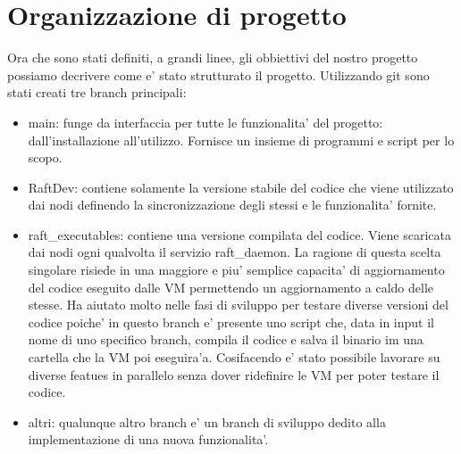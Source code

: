 \section{Organizzazione di progetto}
Ora che sono stati definiti, a grandi linee, gli obbiettivi del nostro progetto possiamo
decrivere come e' stato strutturato il progetto. 
Utilizzando git sono stati creati tre branch principali:
\begin{itemize}
    \item main: funge da interfaccia per tutte le funzionalita' del progetto:
                dall'installazione all'utilizzo. Fornisce un insieme di programmi e script
                per lo scopo.
    \item RaftDev:  contiene solamente la versione stabile del codice che viene utilizzato dai nodi
                    definendo la sincronizzazione degli stessi e le funzionalita' fornite.
    \item raft\_executables: contiene una versione compilata del codice. Viene scaricata dai nodi
                            ogni qualvolta il servizio raft\_daemon. La ragione di questa 
                            scelta singolare risiede in una maggiore e piu' semplice capacita' di
                            aggiornamento del codice eseguito dalle VM permettendo un aggiornamento
                            a caldo delle stesse. Ha aiutato molto nelle fasi di sviluppo per testare
                            diverse versioni del codice poiche' in questo branch e' presente uno script
                            che, data in input il nome di uno specifico branch, compila il codice
                            e salva il binario im una cartella che la VM poi eseguira'a.
                            Cosifacendo e' stato possibile lavorare su diverse featues in parallelo
                            senza dover ridefinire le VM per poter testare il codice.
    \item altri: qualunque altro branch e' un branch di sviluppo dedito alla implementazione di una
                 nuova funzionalita'.
\end{itemize}
